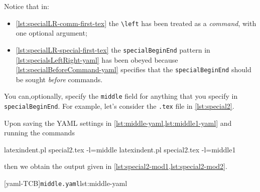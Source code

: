 	\begin{minipage}{.49\linewidth}
	\end{minipage}
	\hfill
	\begin{minipage}{.49\linewidth}
	\end{minipage}

	Notice that in:
	\begin{itemize}
		\item \cref{lst:specialLR-comm-first-tex} the \lstinline!\left! has been treated as a
		      \emph{command}, with one optional argument;
		\item \cref{lst:specialLR-special-first-tex} the \texttt{specialBeginEnd} pattern in
		      \cref{lst:specialsLeftRight-yaml}
		      has been obeyed because \cref{lst:specialBeforeCommand-yaml} specifies that the
		      \texttt{specialBeginEnd} should be sought \emph{before} commands.
	\end{itemize}

	You can,optionally, specify%
	 the \texttt{middle} field for anything that you specify in
	\texttt{specialBeginEnd}. For example, let's consider the \texttt{.tex} file in
	\cref{lst:special2}.


	Upon saving the YAML settings in \cref{lst:middle-yaml,lst:middle1-yaml} and running the
	commands
	\begin{commandshell}
latexindent.pl special2.tex -l=middle
latexindent.pl special2.tex -l=middle1
\end{commandshell}
	then we obtain the output given in \cref{lst:special2-mod1,lst:special2-mod2}.

	\begin{cmhtcbraster}
		[yaml-TCB]{\texttt{middle.yaml}}{lst:middle-yaml}
	\end{cmhtcbraster}

